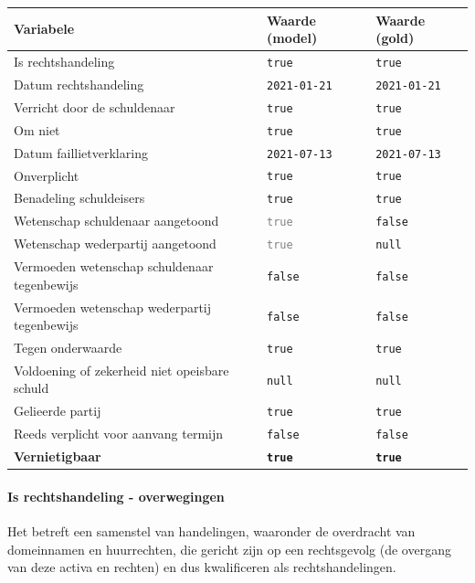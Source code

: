 \documentclass[
  dutch,
  a4paper,
]{article}
\begin{document}
\begin{center}
\small
\begin{tabular}{@{}p{7.4cm}p{2.6cm}p{2.6cm}@{}}
\toprule
Variabele & Waarde (model) & Waarde (gold) \\
\midrule
Is rechtshandeling & \texttt{true} & \texttt{true} \\
Datum rechtshandeling & \texttt{2021-01-21} & \texttt{2021-01-21} \\
Verricht door de schuldenaar & \texttt{true} & \texttt{true} \\
Om niet & \texttt{true} & \texttt{true} \\
Datum faillietverklaring & \texttt{2021-07-13} & \texttt{2021-07-13} \\
Onverplicht & \texttt{true} & \texttt{true} \\
Benadeling schuldeisers & \texttt{true} & \texttt{true} \\
Wetenschap schuldenaar aangetoond & \textcolor{gray}{\texttt{true}} & \texttt{false} \\
Wetenschap wederpartij aangetoond & \textcolor{gray}{\texttt{true}} & \texttt{null} \\
Vermoeden wetenschap schuldenaar tegenbewijs & \texttt{false} & \texttt{false} \\
Vermoeden wetenschap wederpartij tegenbewijs & \texttt{false} & \texttt{false} \\
Tegen onderwaarde & \texttt{true} & \texttt{true} \\
Voldoening of zekerheid niet opeisbare schuld & \texttt{null} & \texttt{null} \\
Gelieerde partij & \texttt{true} & \texttt{true} \\
Reeds verplicht voor aanvang termijn & \texttt{false} & \texttt{false} \\
\textbf{Vernietigbaar} & \textbf{\texttt{true}} & \textbf{\texttt{true}} \\
\bottomrule
\end{tabular}
\end{center}

\paragraph{Is rechtshandeling - overwegingen}\label{is-rechtshandeling---overwegingen-23}

Het betreft een samenstel van handelingen, waaronder de overdracht van domeinnamen en huurrechten, die gericht zijn op een rechtsgevolg (de overgang van deze activa en rechten) en dus kwalificeren als rechtshandelingen.
\end{document}
